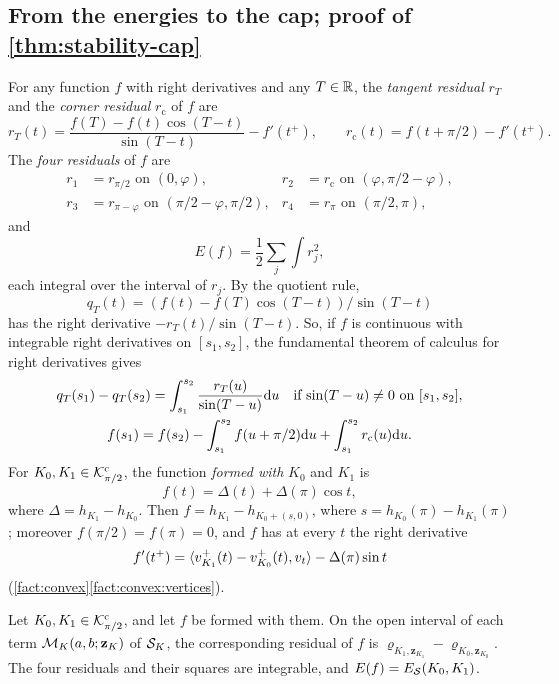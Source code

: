\subsection{From the energies to the cap; proof of
\texorpdfstring{\cref{thm:stability-cap}}{the cap estimate}}\label{sec:stab-cap}

For any function $f$ with right derivatives and any $T\in\mathbb{R}$, the
\emph{tangent residual} $r_T$ and the \emph{corner residual} $r_{\mathrm c}$
of $f$ are
\[
  r_T(t)=\frac{f(T)-f(t)\cos(T-t)}{\sin(T-t)}-f'(t^+),\qquad
  r_{\mathrm c}(t)=f(t+\pi/2)-f'(t^+).
\]
The \emph{four residuals} of $f$ are
\begin{align*}
  r_1&=r_{\pi/2}\text{ on }(0,\varphi), &
  r_2&=r_{\mathrm c}\text{ on }(\varphi,\pi/2-\varphi),\\
  r_3&=r_{\pi-\varphi}\text{ on }(\pi/2-\varphi,\pi/2), &
  r_4&=r_\pi\text{ on }(\pi/2,\pi),
\end{align*}
and
\[
  E(f)=\frac12\sum_j\int r_j^2,
\]
each integral over the interval of $r_j$. By the quotient rule,
\[
  q_T(t)=(f(t)-f(T)\cos(T-t))/\sin(T-t)
\]
has the right derivative $-r_T(t)/\sin(T-t)$. So, if $f$ is continuous with
integrable right derivatives on $[s_1,s_2]$, the fundamental theorem of
calculus for right derivatives gives
\begin{gather}
  q_T(s_1)-q_T(s_2)=\int_{s_1}^{s_2}\frac{r_T(u)}{\sin(T-u)}\mathrm{d} u\quad
  \text{if $\sin(T-u)\ne0$ on $[s_1,s_2]$},\label{eq:stab-ftc}\\
  f(s_1)=f(s_2)-\int_{s_1}^{s_2}f(u+\pi/2)\mathrm{d} u
    +\int_{s_1}^{s_2}r_{\mathrm c}(u)\mathrm{d} u.\notag
\end{gather}
For $K_0,K_1\in\mathcal{K}^{\mathrm{c}}_{\pi/2}$, the function \emph{formed with} $K_0$ and $K_1$
is
\[
  f(t)=\Delta(t)+\Delta(\pi)\cos t,
\]
where $\Delta=h_{K_1}-h_{K_0}$. Then $f=h_{K_1}-h_{K_0+(s,0)}$, where
$s=h_{K_0}(\pi)-h_{K_1}(\pi)$; moreover $f(\pi/2)=f(\pi)=0$, and $f$ has at
every $t$ the right derivative
\[
  f'(t^+)=\langle v^+_{K_1}(t)-v^+_{K_0}(t),v_t\rangle-\Delta(\pi)\sin t
\]
(\cref{fact:convex}\ref{fact:convex:vertices}).

\begin{lemma}\label{lem:stab-residuals}
Let $K_0,K_1\in\mathcal{K}^{\mathrm{c}}_{\pi/2}$, and let $f$ be formed with them. On the open
interval of each term $\mathcal{M}_K(a,b;\mathbf z_K)$ of $\mathcal{S}_K$, the corresponding
residual of $f$ is $\varrho_{K_1,\mathbf z_{K_1}}-\varrho_{K_0,\mathbf
z_{K_0}}$. The four residuals and their squares are integrable, and
$E(f)=E_{\mathcal{S}}(K_0,K_1)$.
\end{lemma}

